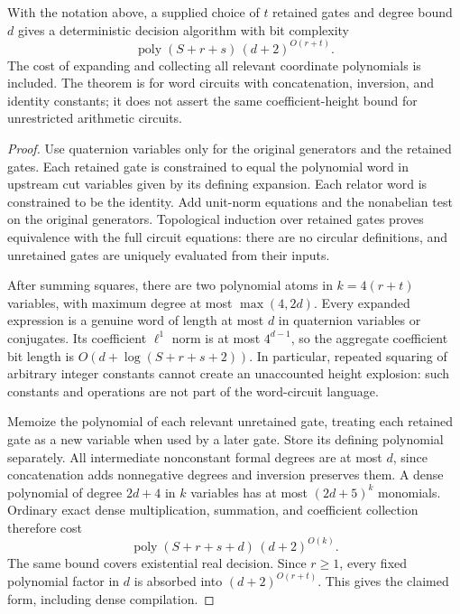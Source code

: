 \begin{theorem}
\label{thm:su2-hybrid}
With the notation above, a supplied choice of $t$ retained gates and degree
bound $d$ gives a deterministic decision algorithm with bit complexity
\[
 \operatorname{poly}(S+r+s)\,(d+2)^{O(r+t)}.
\]
The cost of expanding and collecting all relevant coordinate polynomials
is included.  The theorem is for word circuits with concatenation,
inversion, and identity constants; it does not assert the same
coefficient-height bound for unrestricted arithmetic circuits.
\end{theorem}

\begin{proof}
Use quaternion variables only for the original generators and the retained
gates.  Each retained gate is constrained to equal the polynomial word in
upstream cut variables given by its defining expansion.  Each relator word
is constrained to be the identity.  Add unit-norm equations and the
nonabelian test on the original generators.  Topological induction over
retained gates proves equivalence with the full circuit equations: there
are no circular definitions, and unretained gates are uniquely evaluated
from their inputs.

After summing squares, there are two polynomial atoms in
$k=4(r+t)$ variables, with maximum degree at most
$\max(4,2d)$.  Every expanded expression is a genuine word of length at
most $d$ in quaternion variables or conjugates.  Its coefficient
$\ell^1$ norm is at most $4^{d-1}$, so the aggregate coefficient bit
length is $O(d+\log(S+r+s+2))$.  In particular, repeated squaring of
arbitrary integer constants cannot create an unaccounted height explosion:
such constants and operations are not part of the word-circuit language.

Memoize the polynomial of each relevant unretained gate, treating each
retained gate as a new variable when used by a later gate.  Store its
defining polynomial separately.  All intermediate nonconstant formal
degrees are at most $d$, since concatenation adds nonnegative degrees
and inversion preserves them.  A dense polynomial of degree $2d+4$ in
$k$ variables has at most $(2d+5)^k$ monomials.  Ordinary exact dense
multiplication, summation, and coefficient collection therefore cost
\[
 \operatorname{poly}(S+r+s+d)\,(d+2)^{O(k)}.
\]
The same bound covers existential real decision.  Since $r\geq1$, every
fixed polynomial factor in $d$ is absorbed into $(d+2)^{O(r+t)}$.
This gives the claimed form, including dense compilation.
\end{proof}

